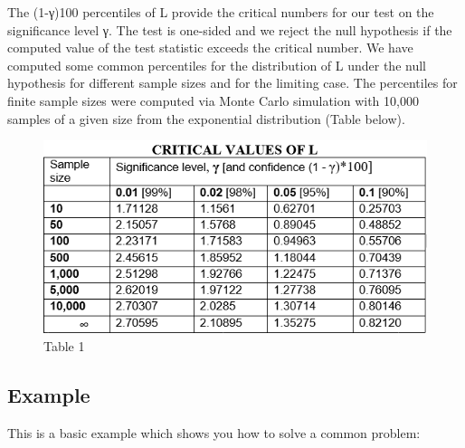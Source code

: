 \documentclass[
]{article}
\begin{document}
The (1-γ)100 percentiles of L provide the critical numbers for our test
on the significance level γ. The test is one-sided and we reject the
null hypothesis if the computed value of the test statistic exceeds the
critical number. We have computed some common percentiles for the
distribution of L under the null hypothesis for different sample sizes
and for the limiting case. The percentiles for finite sample sizes were
computed via Monte Carlo simulation with 10,000 samples of a given size
from the exponential distribution (Table below).

\begin{figure}
\centering
\includegraphics{man/figures/Table1.PNG}
\caption{Table 1}
\end{figure}

\hypertarget{example}{%
\subsection{Example}\label{example}}

This is a basic example which shows you how to solve a common problem:
\end{document}

